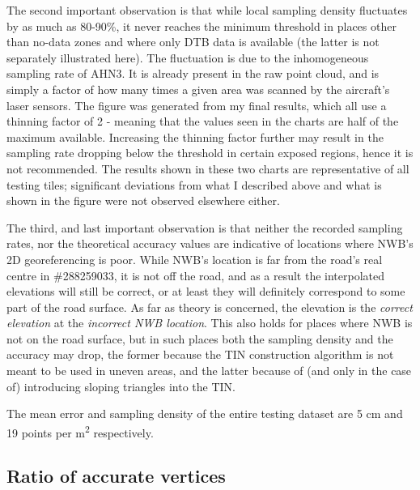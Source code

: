 The second important observation is that while local sampling density fluctuates by as much as 80-90\%, it never reaches the minimum threshold in places other than no-data zones and where only DTB data is available (the latter is not separately illustrated here). The fluctuation is due to the inhomogeneous sampling rate of AHN3. It is already present in the raw point cloud, and is simply a factor of how many times a given area was scanned by the aircraft's laser sensors. The figure was generated from my final results, which all use a thinning factor of 2 - meaning that the values seen in the charts are half of the maximum available. Increasing the thinning factor further may result in the sampling rate dropping below the threshold in certain exposed regions, hence it is not recommended. The results shown in these two charts are representative of all testing tiles; significant deviations from what I described above and what is shown in the figure were not observed elsewhere either.

The third, and last important observation is that neither the recorded sampling rates, nor the theoretical accuracy values are indicative of locations where NWB's 2D georeferencing is poor. While NWB's location is far from the road's real centre in \#288259033, it is not off the road, and as a result the interpolated elevations will still be correct, or at least they will definitely correspond to some part of the road surface. As far as theory is concerned, the elevation is the \textit{correct elevation} at the \textit{incorrect NWB location}. This also holds for places where NWB is not on the road surface, but in such places both the sampling density and the accuracy may drop, the former because the TIN construction algorithm is not meant to be used in uneven areas, and the latter because of (and only in the case of) introducing sloping triangles into the TIN.

The mean error and sampling density of the entire testing dataset are 5 cm and 19 points per m\textsuperscript{2} respectively.

\subsection{Ratio of accurate vertices}
\label{sub:completeness}

